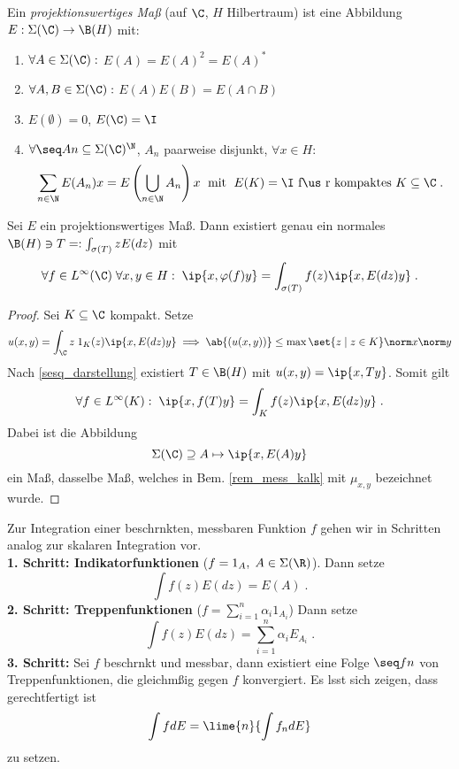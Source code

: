 	\begin{definition}
		Ein \textit{projektionswertiges Ma\ss{}} (auf $\C$, $H$ Hilbertraum) ist eine Abbildung \(E:\Sigma(\C)\to \B(H)\) mit:
		\begin{enumerate}
			\item \(\forall A \in \Sigma(\C):\) \(E(A) = E(A)^2 = E(A)^*\)
			\item \(\forall A, B \in \Sigma(\C):\) \(E(A)E(B) = E(A\cap B)\)
			\item \(E(\emptyset) = 0\), \(E(\C) = \I\)
			\item \(\forall \seq An \subseteq \Sigma(\C)^\N\), $A_n$ paarweise disjunkt, \(\forall x\in H:\)
			\[\sum_{n\in\N}E(A_n)x = E\left(\bigcup_{n\in\N}A_n\right)x\;\text{ mit }\; E(K) = \I \text{ f\us r kompaktes }K\subseteq \C\;.\]
		\end{enumerate}
	\end{definition}
	
	\begin{theorem}
		Sei $E$ ein projektionswertiges Ma\ss{}. Dann existiert genau ein normales \(\B(H)\ni T =: \int_{\sigma(T)} z E(dz)\) mit
		\[\forall f \in L^\infty(\C)\;\forall x, y\in H:\; \ip{x,\varphi(f)y} = \int_{\sigma(T)} f(z)\ip{x,E(dz)y}\;.\]
	\end{theorem}
		\begin{proof}
			Sei $K\subseteq \C$ kompakt. Setze
			\[u(x,y) = \int_{\C} z \;1_K(z) \ip{x, E(dz)y} \implies \ab{(u(x,y))} \leq \max\set{z\;\vert\;z\in K}\norm x\norm y\]
			Nach \ref{sesq_darstellung} existiert \(T\in \B(H)\) mit \(u(x,y) = \ip{x,Ty}\). Somit gilt 
			\[\forall f \in L^\infty(K):\; \ip{x, f(T)y} = \int_K f(z) \ip{x, E(dz) y}\;.\]
			Dabei ist die Abbildung 
			\[\Sigma(\C) \supseteq A \mapsto \ip{x, E(A)y}\]
			ein Ma\ss{}, dasselbe Ma\ss{}, welches in Bem. \ref{rem_mess_kalk} mit \(\mu_{x,y}\) bezeichnet wurde.
		\end{proof}
		\begin{rem}
			Zur Integration einer beschr\as nkten, messbaren Funktion $f$ gehen wir in Schritten analog zur skalaren Integration vor.\\
			\textbf{1. Schritt: Indikatorfunktionen} (\(f = 1_A,\; A\in\Sigma(\R)\)). Dann setze
			\[\int f(z) E(dz) = E(A)\;.\]
			\textbf{2. Schritt: Treppenfunktionen} (\(f = \sum_{i=1}^n \alpha_i 1_{A_i}\)) Dann setze
			\[\int f(z) E(dz) = \sum_{i=1}^n \alpha_i E_{A_i}\;.\]
			\textbf{3. Schritt:} Sei $f$ beschr\as nkt und messbar, dann existiert eine Folge \(\seq fn\) von Treppenfunktionen, die gleichm\as \ss{}ig gegen $f$ konvergiert. Es l\as sst sich zeigen, dass gerechtfertigt ist
			\[\int f dE = \lime{n}{\int f_n dE}\]
			zu setzen.
		\end{rem}
		

